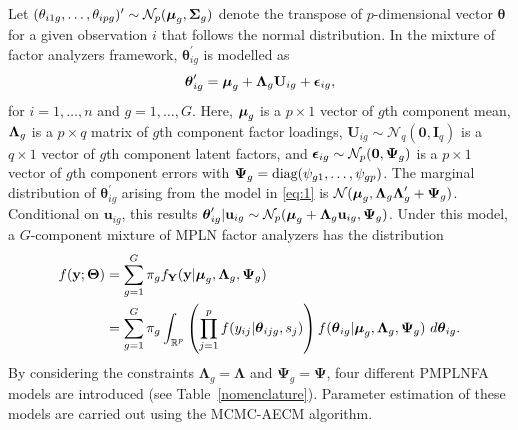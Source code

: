 \documentclass[12pt]{article}
\newcommand{\vecU}{\mathbf{U}}
\newcommand{\vecI}{\mathbf{I}}
\newcommand{\veczero}{\mathbf{0}}
\newcommand{\vecmu}{\mbox{\boldmath$\mu$}}
\newcommand{\vecLambda}{\mbox{\boldmath$\Lambda$}}
\newcommand{\matepsilon}{\mbox{\boldmath$\epsilon$}}
\newcommand{\matPsi}{\mbox{\boldmath$\Psi$}}
\DeclareMathOperator{\R}{\mathbb{R}}
\begin{document}
Let $(\theta_{i1g},\ldots,\theta_{ipg})^{\prime} \sim \mathcal{N}_{p}(\vecmu_g,\mathbf{\Sigma}_g)$ denote the transpose of $p$-dimensional vector $\boldsymbol{\theta}$ for a given observation $i$ that follows the normal distribution. In the mixture of factor analyzers framework, $\boldsymbol{\theta}_{ig}^{\prime}$ is modelled as
\begin{equation}
\label{eq:1}
\boldsymbol{\theta}_{ig}^{\prime} = \vecmu_g + \vecLambda_g \vecU_{ig}+ \matepsilon_{ig},
\end{equation}
for $i=1, \ldots, n$ and $g=1, \ldots, G$. Here, $\vecmu_g$ is a $p \times 1$ vector of $g$th component mean, $\vecLambda_g$ is a $p \times q$ matrix of $g$th component factor loadings, $\vecU_{ig} \sim \mathcal{N}_q(\veczero,\vecI_q)$ is a $q \times 1$ vector of $g$th component latent factors, and $\matepsilon_{ig}\sim\mathcal{N}_p(\veczero,\matPsi_g)$ is a $p \times 1$ vector of $g$th component errors with $\matPsi_g = \text{diag}(\psi_{g1},\ldots,\psi_{gp})$. The marginal distribution of $\boldsymbol{\theta}_{ig}^{\prime}$ arising from the model in \eqref{eq:1} is $\mathcal{N}(\vecmu_g,\vecLambda_g \vecLambda_g'+\matPsi_g)$. Conditional on $\mathbf{u}_{ig}$, this results $\boldsymbol{\theta}_{ig}^{\prime}|\mathbf{u}_{ig} \sim \mathcal{N}_p(\vecmu_g + \vecLambda_g \mathbf{u}_{ig}, \matPsi_g)$. Under this model, a $G$-component mixture of MPLN factor analyzers has the distribution
\begin{equation*}
\begin{split}
f(\mathbf{y};\boldsymbol{\Theta}) & = \sum_{g=1}^G\pi_gf_{\mathbf{Y}}(\mathbf{y}|\vecmu_g,\mathbf{\Lambda}_g, \mathbf{\Psi}_g)  \\
& = \sum_{g=1}^{G}  \pi_g \int_{\R^p} \left( \prod _{j=1}^p f(y_{ij}| \boldsymbol{\theta}_{ijg}, s_j) \right) f(\boldsymbol{\theta}_{ig}|\vecmu_g,\mathbf{\Lambda}_g, \mathbf{\Psi}_g) ~d\boldsymbol{\theta}_{ig}.
\end{split}
\end{equation*}
By considering the constraints $\mathbf{\Lambda}_g = \mathbf{\Lambda}$ and $\mathbf{\Psi}_g = \mathbf{\Psi}$, four different PMPLNFA models are introduced (see Table~\ref{nomenclature}). Parameter estimation of these models are carried out using the MCMC-AECM algorithm. 
\end{document}
